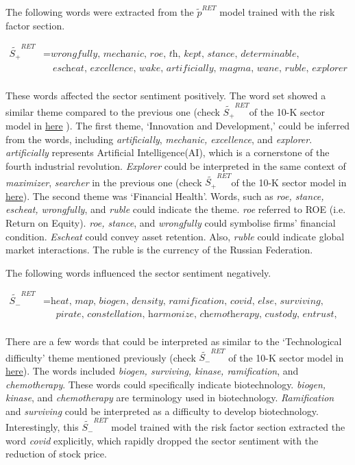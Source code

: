 \documentclass[logo,bsc,singlespacing,parskip]{infthesis}
\begin{document}
\label{word_risk_qqq}


The following words were extracted from the $\tilde{p}^{RET}$ model trained with the risk factor section.

\begin{align*}
\tilde{S_{+}}^{RET} &= \textit{wrongfully, mechanic, roe, th, kept, stance, determinable,} \\
               &\quad \textit{escheat, excellence, wake, artificially, magma, wane, ruble, explorer} \\
\end{align*}

These words affected the sector sentiment positively. The word set showed a similar theme compared to the previous one (check $\tilde{S_{+}}^{RET}$of the 10-K sector model in \hyperref[word_all_qqq]{here} ). The first theme, ‘Innovation and Development,’ could be inferred from the words, including \textit{artificially}, \textit{mechanic, excellence}, and \textit{explorer}. \textit{artificially} represents Artificial Intelligence(AI), which is a cornerstone of the fourth industrial revolution. \textit{Explorer} could be interpreted in the same context of \textit{maximizer}, \textit{searcher} in the previous one (check $\tilde{S_{+}}^{RET}$of the 10-K sector model  in \hyperref[word_all_qqq]{here}). The second theme was ‘Financial Health’. Words, such as \textit{roe, stance, escheat, wrongfully}, and \textit{ruble} could indicate the theme. \textit{roe} referred to ROE (i.e. Return on Equity). \textit{roe, stance}, and \textit{wrongfully} could symbolise firms’ financial condition. \textit{Escheat} could convey asset retention. Also, \textit{ruble} could indicate global market interactions. The ruble is the currency of the Russian Federation.

The following words influenced the sector sentiment negatively. 

\begin{align*}
\tilde{S_{-}}^{RET} &= \textit{heat, map, biogen, density, ramification, covid, else, surviving,} \\
               &\quad \textit{ pirate, constellation, harmonize, chemotherapy, custody, entrust, kinase} \\
\end{align*}

There are a few words that could be interpreted as similar to the ‘Technological difficulty’ theme mentioned previously (check $\tilde{S_{-}}^{RET}$ of the 10-K sector model in \hyperref[word_all_qqq]{here}). The words included \textit{biogen, surviving, kinase, ramification}, and \textit{chemotherapy}. These words could specifically indicate biotechnology. \textit{biogen, kinase}, and \textit{chemotherapy} are terminology used in biotechnology. \textit{Ramification} and \textit{surviving} could be interpreted as a difficulty to develop biotechnology. Interestingly, this $\tilde{S_{-}}^{RET}$ model trained with the risk factor section extracted the word \textit{covid} explicitly, which rapidly dropped the sector sentiment with the reduction of stock price.
\end{document}
